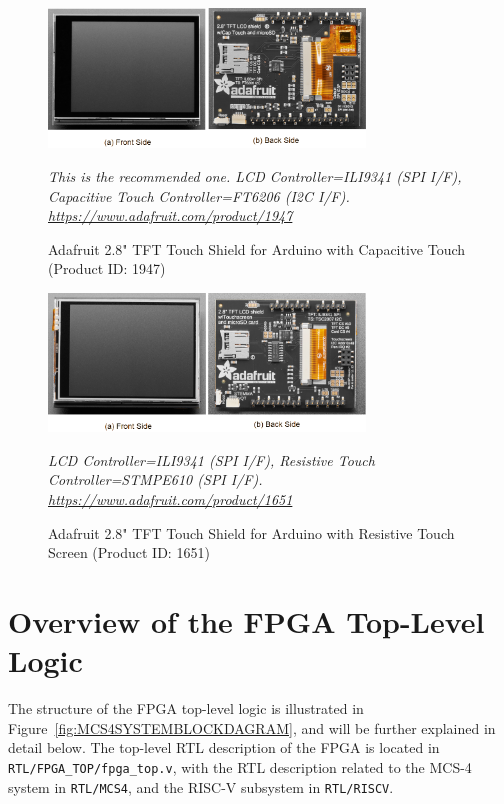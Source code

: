 \begin{figure}[htbp]
  \centering
  \includegraphics[width=0.75\textwidth]{./Figure/LCDPanelCapacitive.png}
  \caption{Adafruit 2.8" TFT Touch Shield for Arduino with Capacitive Touch (Product ID: 1947)}
  \textit{This is the recommended one. LCD Controller=ILI9341 (SPI I/F), Capacitive Touch Controller=FT6206 (I2C I/F).}\\
  \scriptsize{\textit{\url{https://www.adafruit.com/product/1947}}}
  \label{fig:LCDPANELCAPACITIVE}
\end{figure}
\begin{figure}[htbp]
  \centering
  \includegraphics[width=0.75\textwidth]{./Figure/LCDPanelResistive.png}
  \caption{Adafruit 2.8" TFT Touch Shield for Arduino with Resistive Touch Screen (Product ID: 1651)}
  \textit{LCD Controller=ILI9341 (SPI I/F), Resistive Touch Controller=STMPE610 (SPI I/F).}\\
  \scriptsize{\textit{\url{https://www.adafruit.com/product/1651}}}
  \label{fig:LCDPANELRESISTIVE}
\end{figure}

\section{Overview of the FPGA Top-Level Logic}
The structure of the FPGA top-level logic is illustrated in Figure~\ref{fig:MCS4SYSTEMBLOCKDAGRAM}, and will be further explained in detail below. The top-level RTL description of the FPGA is located in \texttt{RTL/FPGA\_TOP/fpga\_top.v}, with the RTL description related to the MCS-4 system in \texttt{RTL/MCS4}, and the RISC-V subsystem in \texttt{RTL/RISCV}.
